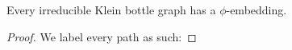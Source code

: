 \begin{lemma}
    Every irreducible Klein bottle graph has a $\phi$-embedding. 
\end{lemma}

\begin{proof}
    We label every path as such:
\end{proof}